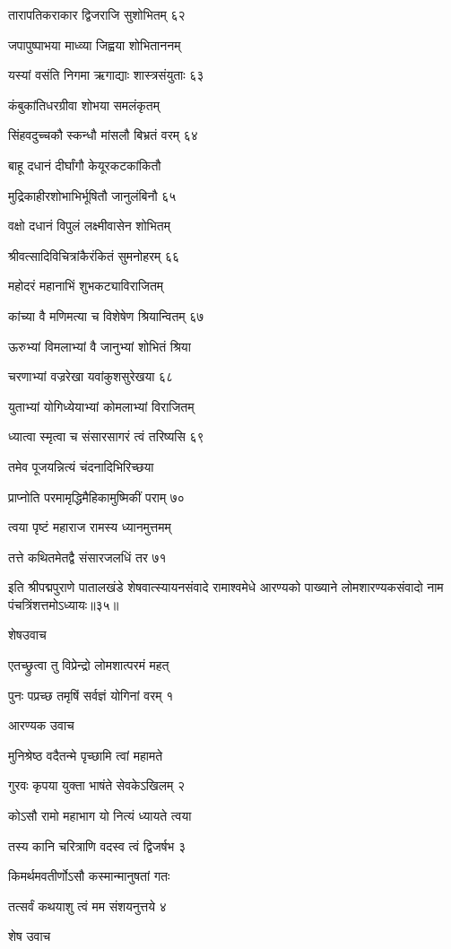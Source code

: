 तारापतिकराकार द्विजराजि सुशोभितम् ६२

जपापुष्पाभया माध्व्या जिह्वया शोभिताननम्

यस्यां वसंति निगमा ऋगाद्याः शास्त्रसंयुताः ६३

कंबुकांतिधरग्रीवा शोभया समलंकृतम्

सिंहवदुच्चकौ स्कन्धौ मांसलौ बिभ्रतं वरम् ६४

बाहू दधानं दीर्घांगौ केयूरकटकांकितौ

मुद्रिकाहीरशोभाभिर्भूषितौ जानुलंबिनौ ६५

वक्षो दधानं विपुलं लक्ष्मीवासेन शोभितम्

श्रीवत्सादिविचित्रांकैरंकितं सुमनोहरम् ६६

महोदरं महानाभिं शुभकट्याविराजितम्

कांच्या वै मणिमत्या च विशेषेण श्रियान्वितम् ६७

ऊरुभ्यां विमलाभ्यां वै जानुभ्यां शोभितं श्रिया

चरणाभ्यां वज्ररेखा यवांकुशसुरेखया ६८

युताभ्यां योगिध्येयाभ्यां कोमलाभ्यां विराजितम्

ध्यात्वा स्मृत्वा च संसारसागरं त्वं तरिष्यसि ६९

तमेव पूजयन्नित्यं चंदनादिभिरिच्छया

प्राप्नोति परमामृद्धिमैहिकामुष्मिकीं पराम् ७०

त्वया पृष्टं महाराज रामस्य ध्यानमुत्तमम्

तत्ते कथितमेतद्वै संसारजलधिं तर ७१

इति श्रीपद्मपुराणे पातालखंडे शेषवात्स्यायनसंवादे रामाश्वमेधे आरण्यको पाख्याने लोमशारण्यकसंवादो नाम पंचत्रिंशत्तमोऽध्यायः॥३५॥


शेषउवाच

एतच्छ्रुत्वा तु विप्रेन्द्रो लोमशात्परमं महत्

पुनः पप्रच्छ तमृषिं सर्वज्ञं योगिनां वरम् १

आरण्यक उवाच

मुनिश्रेष्ठ वदैतन्मे पृच्छामि त्वां महामते

गुरवः कृपया युक्ता भाषंते सेवकेऽखिलम् २

कोऽसौ रामो महाभाग यो नित्यं ध्यायते त्वया

तस्य कानि चरित्राणि वदस्व त्वं द्विजर्षभ ३

किमर्थमवतीर्णोऽसौ कस्मान्मानुषतां गतः

तत्सर्वं कथयाशु त्वं मम संशयनुत्तये ४

शेष उवाच

